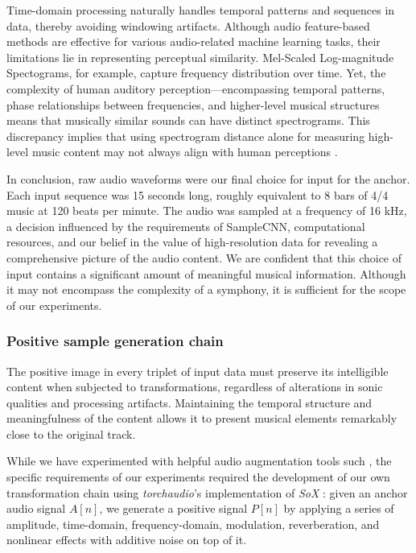 Time-domain processing naturally handles temporal patterns and sequences in data, thereby avoiding windowing artifacts. Although audio feature-based methods are effective for various audio-related machine learning tasks, their limitations lie in representing perceptual similarity. Mel-Scaled Log-magnitude Spectograms, for example, capture frequency distribution over time. Yet, the complexity of human auditory perception—encompassing temporal patterns, phase relationships between frequencies, and higher-level musical structures means that musically similar sounds can have distinct spectrograms. This discrepancy implies that using spectrogram distance alone for measuring high-level music content may not always align with human perceptions \cite{Kim2020OneStrategies, Mesostructures2023}.

In conclusion, raw audio waveforms were our final choice for input for the anchor. Each input sequence was 15 seconds long, roughly equivalent to 8 bars of 4/4 music at 120 beats per minute. The audio was sampled at a frequency of 16 kHz, a decision influenced by the requirements of SampleCNN, computational resources, and our belief in the value of high-resolution data for revealing a comprehensive picture of the audio content. We are confident that this choice of input contains a significant amount of meaningful musical information. Although it may not encompass the complexity of a symphony, it is sufficient for the scope of our experiments.

\subsubsection{Positive sample generation chain}

The positive image in every triplet of input data must preserve its intelligible content when subjected to transformations, regardless of alterations in sonic qualities and processing artifacts. Maintaining the temporal structure and meaningfulness of the content allows it to present musical elements remarkably close to the original track.

While we have experimented with helpful audio augmentation tools such \cite{Spijkervet2021Spijkervet/torchaudio-augmentations:V1.0, Kharitonov2020DataDomain}, the specific requirements of our experiments required the development of our own transformation chain using \textit{torchaudio}'s \cite{Yang2021TorchAudio:Processing} implementation of \textit{SoX} \cite{sox}: given an anchor audio signal $A[n]$, we generate a positive signal $P[n]$ by applying a series of amplitude, time-domain, frequency-domain, modulation, reverberation, and nonlinear effects with additive noise on top of it. 

